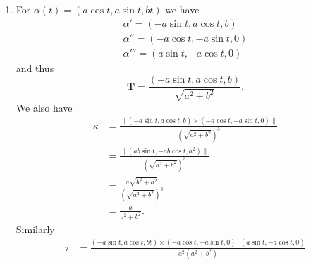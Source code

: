 \documentclass[12 pt, letterpaper]{hmcpset}
\begin{document}
\begin{solution}
\begin{enumerate}
			Squaring both sides, we get
			\[
				\kappa^{2} \cos^{2}{\vartheta} = \tau^{2} (1 - \cos^{2}{\vartheta})
			\]
			which we can rewrite as
			\[
				\cos^{2}{\vartheta} = \frac{\tau^{2}}{\kappa^{2} + \tau^{2}}.
			\]
			Note that this also gives us
			\[
				\begin{split}
					\sin^{2}{\vartheta} & = 1 - \cos^{2}{\vartheta} \\
							    & = 1 - \frac{\tau^{2}}{\kappa^{2} + \tau^{2}} \\
							    & = \frac{\kappa^{2}}{\kappa^{2} + \tau^{2}} 
				\end{split}
			\] 

			Taking square roots we get
			\[
				\begin{gathered}
					\cos{\vartheta} = \frac{\tau}{\sqrt{\kappa^{2} + \tau^{2}}} \\
					\sin{\vartheta} = \frac{\kappa}{\sqrt{\kappa^{2} + \tau^{2}}}
				\end{gathered}
			\]
			and thus
			\[
				[\mathbf{u}, \mathbf{p}] = \frac{\tau}{\sqrt{\kappa^{2} + \tau^{2}}} \mathbf{T} + \frac{\kappa}{\sqrt{\kappa^{2} + \tau^{2}}} \mathbf{B}
			\]
			as desired.
		\item For $\alpha(t) = (a \cos{t}, a \sin{t}, bt)$ we have 
			\[
				\begin{gathered}
					\alpha' = (- a \sin{t}, a \cos{t}, b) \\
					\alpha'' = (- a \cos{t}, - a \sin{t}, 0) \\
					\alpha''' = (a \sin{t}, - a \cos{t}, 0)
				\end{gathered}
			\]
			and thus
			\[
				\mathbf{T} = \frac{(- a \sin{t}, a \cos{t}, b)}{\sqrt{a^{2} + b^{2}}}.
			\]
			We also have
			\[
				\begin{split}
					\kappa & = \frac{\lVert (- a \sin{t}, a \cos{t}, b) \times (- a \cos{t}, - a \sin{t}, 0) \rVert}{(\sqrt{a^{2} + b^{2}})^{3}} \\
					       & = \frac{\lVert (ab \sin{t}, -ab \cos{t}, a^{2}) \rVert}{(\sqrt{a^{2} + b^{2}})^{3}} \\
					       & = \frac{a \sqrt{b^{2} + a^{2}}}{(\sqrt{a^{2} + b^{2}})^{3}} \\
					       & = \frac{a}{a^{2} + b^{2}}.
				\end{split}
			\]
			Similarly
			\[
				\begin{split}
					\tau & = \frac{(- a \sin{t}, a \cos{t}, bt) \times (-a \cos{t}, - a \sin{t}, 0) \cdot (a \sin{t}, -a \cos{t}, 0)}{a^{2}(a^{2} + b^{2})} \\

\end{split}\]
\end{enumerate}
\end{solution}
\end{document}

